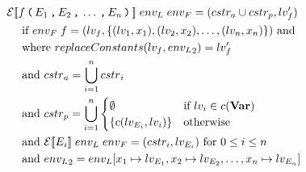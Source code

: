 \begin{align*}
& \mathcal{E}[\![ f \, \texttt{(} \, E_1 \, \texttt{,} \, E_2 \, \texttt{,} \, \dots \, \texttt{,} \, E_n \, \texttt{)} \, ]\!] \; {env_L} \; {env_F} = (cstr_a \cup cstr_p, lv_f') \\
& \quad \text{ if } {env_F} \; f = (lv_f, \{(lv_1, x_1), (lv_2, x_2), \dots, (lv_n, x_n)\}) \text{ and} \\
& \quad \text{ where } replaceConstants(lv_f, {env_L}_2) = lv_f' \\
& \quad \text{ and } {cstr}_a = \bigcup\limits_{i=1}^n {cstr}_i \\
& \quad \text{ and } {cstr}_p = \bigcup\limits_{i=1}^n
  \begin{cases}
    \emptyset &\text{if } lv_i \in c(\mathbf{Var})\\
    \{ c(lv_{E_i}, lv_i) \} & \text{otherwise}
  \end{cases} \\
& \quad \text{ and } \mathcal{E}[\![ E_i ]\!] \; {env_L} \; {env_F} = (cstr_i, lv_{E_i}) \text{ for } 0 \leq i \leq n \\
& \quad \text{ and } {env_L}_2 = {env_L}[x_1 \mapsto lv_{E_1}, x_2 \mapsto lv_{E_2}, \dots, x_n \mapsto lv_{E_n}]
\end{align*}
